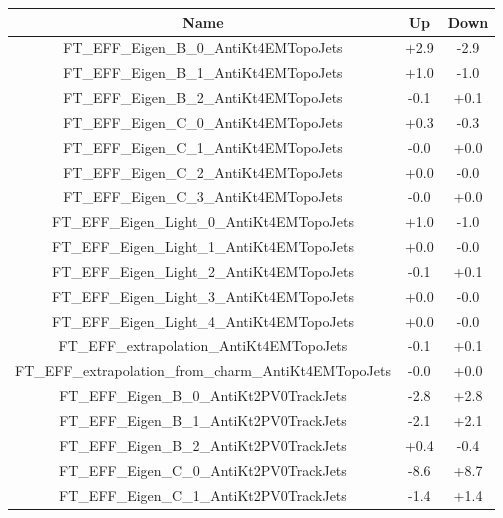 \begin{table}[htbp!]
\begin{center}
\begin{tabular}{c|c|c}
Name                                                         &      Up  &     Down  \\
\hline
FT\_EFF\_Eigen\_B\_0\_AntiKt4EMTopoJets                      &     +2.9 &     -2.9  \\
FT\_EFF\_Eigen\_B\_1\_AntiKt4EMTopoJets                      &     +1.0 &     -1.0  \\
FT\_EFF\_Eigen\_B\_2\_AntiKt4EMTopoJets                      &     -0.1 &     +0.1  \\
FT\_EFF\_Eigen\_C\_0\_AntiKt4EMTopoJets                      &     +0.3 &     -0.3  \\
FT\_EFF\_Eigen\_C\_1\_AntiKt4EMTopoJets                      &     -0.0 &     +0.0  \\
FT\_EFF\_Eigen\_C\_2\_AntiKt4EMTopoJets                      &     +0.0 &     -0.0  \\
FT\_EFF\_Eigen\_C\_3\_AntiKt4EMTopoJets                      &     -0.0 &     +0.0  \\
FT\_EFF\_Eigen\_Light\_0\_AntiKt4EMTopoJets                  &     +1.0 &     -1.0  \\
FT\_EFF\_Eigen\_Light\_1\_AntiKt4EMTopoJets                  &     +0.0 &     -0.0  \\
FT\_EFF\_Eigen\_Light\_2\_AntiKt4EMTopoJets                  &     -0.1 &     +0.1  \\
FT\_EFF\_Eigen\_Light\_3\_AntiKt4EMTopoJets                  &     +0.0 &     -0.0  \\
FT\_EFF\_Eigen\_Light\_4\_AntiKt4EMTopoJets                  &     +0.0 &     -0.0  \\
FT\_EFF\_extrapolation\_AntiKt4EMTopoJets                    &     -0.1 &     +0.1  \\
FT\_EFF\_extrapolation\_from\_charm\_AntiKt4EMTopoJets       &     -0.0 &     +0.0  \\
FT\_EFF\_Eigen\_B\_0\_AntiKt2PV0TrackJets                    &     -2.8 &     +2.8  \\
FT\_EFF\_Eigen\_B\_1\_AntiKt2PV0TrackJets                    &     -2.1 &     +2.1  \\
FT\_EFF\_Eigen\_B\_2\_AntiKt2PV0TrackJets                    &     +0.4 &     -0.4  \\
FT\_EFF\_Eigen\_C\_0\_AntiKt2PV0TrackJets                    &     -8.6 &     +8.7  \\
FT\_EFF\_Eigen\_C\_1\_AntiKt2PV0TrackJets                    &     -1.4 &     +1.4  \\

\end{tabular}
\end{center}
\end{table}
